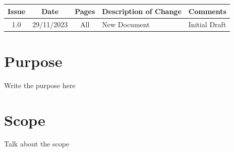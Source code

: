 \documentclass[11pt]{EuclidVIS}
\numberwithin{table}{section}
\numberwithin{figure}{section}
\begin{document}
\newpage



\section*{}
\section*{}

\vspace{+0.3cm}
\noindent
\begin{tabularx}{1.0\textwidth}{ | c | c | c | X | l |}
\hline
\rowcolor{gray!30}
\textbf{Issue} & \textbf{Date} & \textbf{Pages} & \textbf{Description of Change} & \textbf{Comments}\\
\hline
1.0 & 29/11/2023 & All & New Document & Initial Draft \\
\hline
\end{tabularx}

\newpage


\renewcommand*{\contentsname}{\color{MidnightBlue}{Table of Contents}}
\setcounter{tocdepth}{3}
\setlength{\cftbeforetoctitleskip}{-1em}
\tableofcontents
{} 
\thispagestyle{fancy}

\newpage

\section*{Purpose}
Write the purpose here

\section*{Scope}
Talk about the scope
\end{document}
